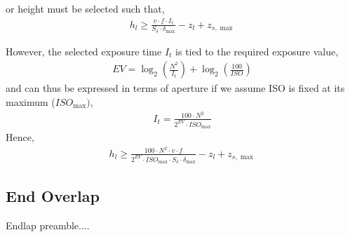 \documentclass[11pt]{article}
\begin{document}
or height must be selected such that,
\begin{align}
  h_l \geq \frac{v\cdot f\cdot I_t}{S_\delta \cdot \delta_{\max}} - z_l + z_{s,\max}
\end{align}

However, the selected exposure time $I_t$ is tied to the required exposure value,
\begin{align}
  EV = \log_2(\frac{N^2}{I_t}) + \log_2(\frac{100}{ISO}) \label{eq:ExposureVal}
\end{align}
and can thus be expressed in terms of aperture if we assume ISO is fixed at its maximum ($ISO_{\max})$,
\begin{align}
  I_t = \frac{100\cdot N^2}{2^{EV} \cdot ISO_{\max}}
\end{align}
Hence,
\begin{align}
  h_l \geq \frac{ 100 \cdot N^2 \cdot v \cdot f}{2^{EV} \cdot ISO_{\max} \cdot S_\delta \cdot \delta_{\max}} - z_l + z_{s,\max}
\end{align}

\subsection{End Overlap}

Endlap preamble....
\end{document}
